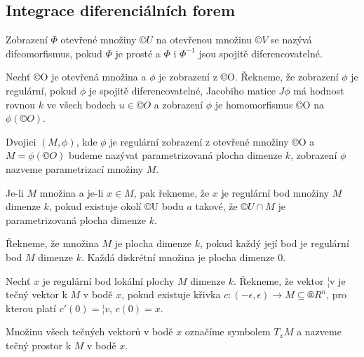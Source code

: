 \documentclass[12pt]{article}                   %
\begin{document}
    \subsection{Integrace diferenciálních forem}
        \begin{poznamka}
            Zobrazení $\Phi$ otevřené množiny $©U$ na otevřenou množinu $©V$ se nazývá difeomorfismus, pokud $\Phi$ je prosté a $\Phi$ i $\Phi^{-1}$ jsou spojitě diferencovatelné.
        \end{poznamka}

        \begin{definice}[regulární]
            Nechť ©O je otevřená množina a $\phi$ je zobrazení z ©O. Řekneme, že zobrazení $\phi$ je regulární, pokud $\phi$ je spojitě diferencovatelné, Jacobiho matice $J\phi$ má hodnost rovnou $k$ ve všech bodech $u \in ©O$ a zobrazení $\phi$ je homomorfismus ©O na $\phi(©O)$.
        \end{definice}

        \begin{definice}
            Dvojici $(M, \phi)$, kde $\phi$ je regulární zobrazení z otevřené množiny ©O a $M = \phi(©O)$ budeme nazývat parametrizovaná plocha dimenze $k$, zobrazení $\phi$ nazveme parametrizací množiny $M$.

            Je-li $M$ množina a je-li $x \in M$, pak řekneme, že $x$ je regulární bod množiny $M$ dimenze $k$, pokud existuje okolí ©U bodu $a$ takové, že $©U \cap M$ je parametrizovaná plocha dimenze $k$.
        \end{definice}

        \begin{definice}
            Řekneme, že množina $M$ je plocha dimenze $k$, pokud každý její bod je regulární bod $M$ dimenze $k$. Každá diskrétní množina je plocha dimenze 0.
        \end{definice}

        \begin{definice}
            Nechť $x$ je regulární bod lokální plochy $M$ dimenze $k$. Řekneme, že vektor ¦v je tečný vektor k $M$ v bodě $x$, pokud existuje křivka $c: (-\epsilon, \epsilon) \rightarrow M \subseteq ®R^n$, pro kterou platí $c'(0) = ¦v$, $c(0) = x$.

            Množinu všech tečných vektorů v bodě $x$ označíme symbolem $T_xM$ a nazveme tečný prostor k $M$ v bodě $x$.
        \end{definice}
\end{document}
